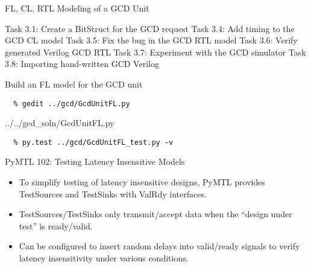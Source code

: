 
\begin{frame}{ FL, CL, RTL Modeling of a GCD Unit}
\begin{cbxlist}
  \1 Task 3.1: Create a BitStruct for the GCD request
  \1 
  \1 
  \1 Task 3.4: Add timing to the GCD CL model
  \1 Task 3.5: Fix the bug in the GCD RTL model
  \1 Task 3.6: Verify generated Verilog GCD RTL
  \1 Task 3.7: Experiment with the GCD simulator
  \1 Task 3.8: Importing hand-written GCD Verilog
\end{cbxlist}
\end{frame}

\begin{task}\begin{frame}[fragile]{Build an FL model for the GCD unit}

\vspace{-0.15in}
\begin{Verbatim}[commandchars=\\\{\}]
  % cd \midtilde/pymtl-tut/build
  % gedit ../gcd/GcdUnitFL.py
\end{Verbatim}
\vspace{-0.2in}

%
{../../gcd_soln/GcdUnitFL.py}

\vspace{-0.22in}
\begin{verbatim}
  % py.test ../gcd/GcdUnitFL_test.py -v
\end{verbatim}
\end{frame}
\end{task}

\begin{frame}{PyMTL 102: Testing Latency Insensitive Models}

\begin{itemize}
  \item To simplify testing of latency insensitive designs, PyMTL provides
        TestSources and TestSinks with ValRdy interfaces.
  \smallskip
  \item TestSources/TestSinks only transmit/accept data when the ``design
        under test'' is ready/valid.
  \smallskip
  \item Can be configured to insert random delays into valid/ready signals
        to verify latency insensitivity under various conditions.
\end{itemize}

  \smallskip
\end{frame}

